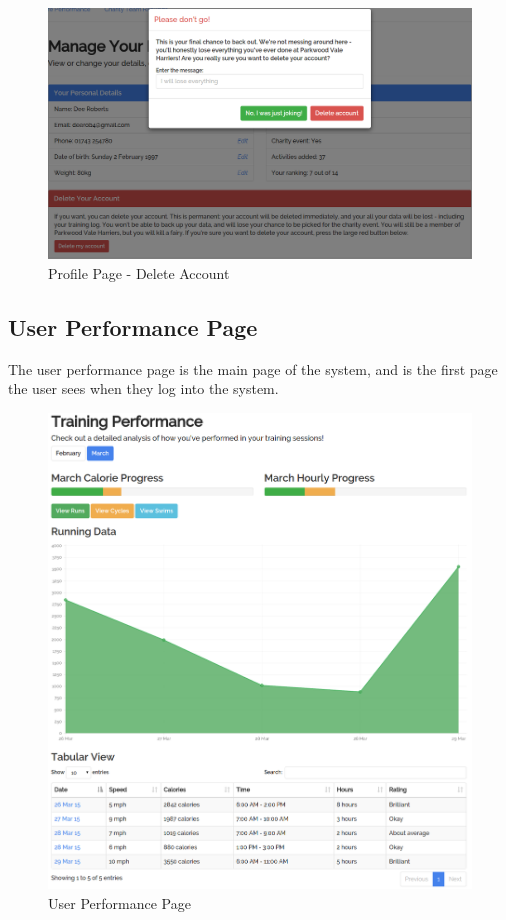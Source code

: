 \documentclass{article}[12pt,a4paper]
\begin{document}
\begin{figure}[h!]
  \includegraphics[scale=0.35]{final_ui/account_delete}
  \caption{Profile Page - Delete Account}
\end{figure}
\clearpage

\subsection{User Performance Page}
The user performance page is the main page of the system, and is the first page the user sees when they log into the system.

\begin{figure}[h!]
  \includegraphics[scale=0.35]{final_ui/user_performance}
  \caption{User Performance Page}
\end{figure}
\clearpage
\end{document}
